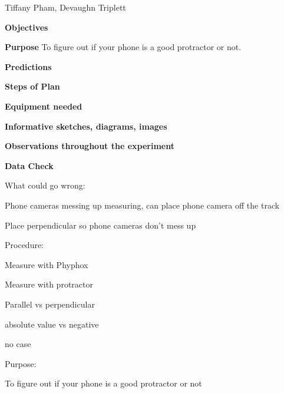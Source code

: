\documentclass[idxtotoc,hyperref,openany]{labbook} %
\begin{document}

\vspace{-5mm}
Tiffany Pham, Devaughn Triplett

\vspace{-2mm}
\textbf{Objectives}



\hfill \break
\textbf{Purpose}
To figure out if your phone is a good protractor or not.

\hfill \break
\textbf{Predictions}

\textbf{Steps of Plan}

\textbf{Equipment needed}

\textbf{Informative sketches, diagrams, images}

\textbf{Observations throughout the experiment}

\textbf{Data Check}

\textbf{}


What could go wrong:

Phone cameras messing up measuring, can place phone camera off the track

Place perpendicular so phone cameras don't mess up 

Procedure:

Measure with Phyphox

Measure with protractor

Parallel vs perpendicular

absolute value vs negative

no case

Purpose:

To figure out if your phone is a good protractor or not





\begin{table}[H]
\caption{Phone measurements on tracks.}
\label{tab:phone}
\end{table}
\end{document}
